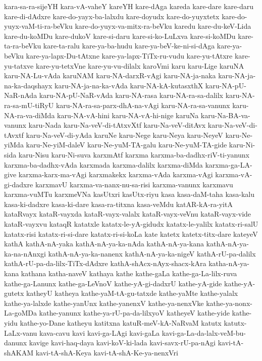 {kara-sa-ra-sijeYH
kara-vA-vaheY
kareYH
kare-dAga
kareda
kare-dare
kare-daru
kare-di-dAdxre
kare-do-yayx-ba-lalxdu
kare-doyudx
kare-do-yuyxtetx
kare-do-yuyx-vaM-ti-ra-beVku
kare-do-yuyx-va-mitx-ra-beVku
karedu
kare-du-keV-Lida
kare-du-koMDu
kare-dukoV
kare-si-daru
kare-si-ko-LuLxva
kare-si-koMDu
kare-ta-ra-beVku
kare-ta-ralu
kare-ya-ba-hudu
kare-ya-beV-ke-ni-si-dAga
kare-ya-beVku
kare-ya-lapx-Du-tAtxne
kare-ya-lapx-TiTx-ru-vudu
kare-yu-tAtxre
kare-yu-tatxve
kare-yu-tetxVne
kare-yu-vu-dilalx
karoVmi
karu
karu-Lige
karuNA
karu-NA-Lu-vAda
karuNAM
karu-NA-darxR-vAgi
karu-NA-ja-naka
karu-NA-ja-na-ka-daqshayx
karu-NA-ja-na-ka-vAda
karu-NA-kA-kutasxthX
karu-NA-pU-NaR-nAda
karu-NA-pU-NaR-vAda
karu-NA-rasa
karu-NA-ra-sa-dalilx
karu-NA-ra-sa-mU-tiRyU
karu-NA-ra-sa-parx-dhA-na-vAgi
karu-NA-ra-sa-vanunx
karu-NA-ra-va-diMda
karu-NA-vA-hini
karu-NA-vA-hi-nige
karuNa
karu-Na-BA-va-vanunx
karu-Nada
karu-Na-veV-di-tAtxvXtf
karu-Na-veV-ditAvx
karu-Na-veV-di-tAvxtf
karu-Na-veV-di-yAda
karuNe
karu-Nege
karu-Neya
karu-NeyeV
karu-Ne-yiMda
karu-Ne-yiM-daleV
karu-Ne-yuM-TA-galu
karu-Ne-yuM-TA-gide
karu-Ni-sida
karu-Nisu
karu-Ni-suva
karxmAtf
karxma
karxma-ba-dadhx-riV-ti-yanunx
karxma-ba-dadhx-vAda
karxmada
karxma-dalilx
karxma-diMda
karxma-ga-LA-give
karxma-karx-ma-vAgi
karxmakekx
karxma-vAda
karxma-vAgi
karxma-vA-gi-dadxre
karxmavU
karxma-va-nanx-nu-sa-risi
karxma-vanunx
karxmavu
karxma-vuMTu
karxmeVNa
kasUtxri
kasUtx-riyu
kasa
kasa-daM-taha
kasa-kalu
kasa-ki-dadxre
kasa-ki-dare
kasa-ra-titxna
kasa-veMdu
katAR-kA-ra-yitA
kataRvayx
kataR-vayxda
kataR-vayx-valalx
kataR-vayx-veVnu
kataR-vayx-vide
kataR-vayxvu
kataqR
katatxle
katatx-le-yA-gidudx
katatx-le-yalilx
katatx-ri-salU
katatx-risi
katatx-ri-si-dare
katatx-ri-si-koLa
kate
katetx
katetx-titx-dare
kateyeV
kathA
kathA-nA-yaka
kathA-nA-ya-ka-nAda
kathA-nA-ya-kana
kathA-nA-ya-ka-na-nAnxgi
kathA-nA-ya-ka-nanenx
kathA-nA-ya-ka-nigeV
kathA-rU-pa-dalilx
kathA-rU-pa-da-lilx-TiTx-dAdxre
kathA-shAcx-nAyx-shacx-kAra
katha-nA-ya-kana
kathana
katha-naveV
kathaya
kathe
kathe-gaLa
kathe-ga-La-lilx-ruva
kathe-ga-Lanunx
kathe-ga-LeVnoV
kathe-yA-gi-dadxrU
kathe-yA-gide
kathe-yA-gutetx
katheyU
katheya
kathe-yaM-tA-gu-tatxde
kathe-yaMte
kathe-yalalx
kathe-ya-lalxde
kathe-yanUnx
kathe-yanenxV
kathe-ya-nenxVke
kathe-ya-nonx-La-goMDa
kathe-yanunx
kathe-ya-rU-pa-da-lilxyoV
katheyeV
kathe-yide
kathe-yidu
kathe-yo-Dane
katheyu
katitxna
katuR-meV-kA-NaRvaM
katutx
katutx-LaLx-vanu
kava-cavu
kavi
kavi-ga-LAgi
kavi-gaLa
kavi-ga-La-da-lalx-veM-bu-danunx
kavige
kavi-haq-daya
kavi-koV-ki-lada
kavi-savx-rU-pa-nAgi
kavi-tA-shAKAM
kavi-tA-shA-Keya
kavi-tA-shA-Ke-ya-nenxVri
}
